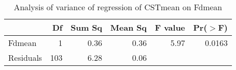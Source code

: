 \begin{table}[ht]
\centering
\caption{Analysis of variance of regression of CSTmean on Fdmean}
\label{tab:cstfd}
\begin{tabular}{lrrrrr}
  \hline
 & Df & Sum Sq & Mean Sq & F value & Pr($>$F) \\ 
  \hline
Fdmean & 1 & 0.36 & 0.36 & 5.97 & 0.0163 \\ 
  Residuals & 103 & 6.28 & 0.06 &  &  \\ 
   \hline
\end{tabular}
\end{table}

